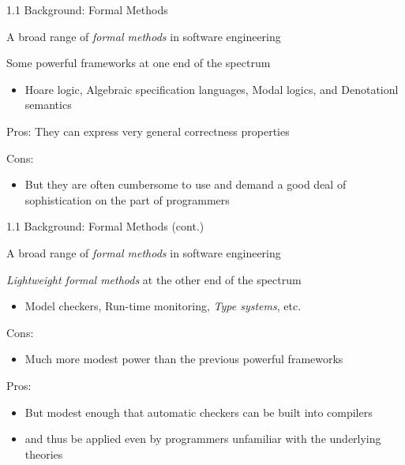 \documentclass[table]{beamer}
\begin{document}
\begin{frame}[t]{1.1 Background: Formal Methods} \vspace{10pt}


A broad range of {\it formal methods } in software engineering

\vspace{10pt}

Some powerful frameworks at one end of the spectrum

\begin{itemize}

\item  Hoare logic, Algebraic specification languages, Modal logics, and Denotationl semantics

\end{itemize}

\vspace{10pt}

Pros: They can express very general correctness properties 

\vspace{10pt}

Cons: 
\begin{itemize}
\item But they are often cumbersome to use and demand a good deal of sophistication on the part of programmers
\end{itemize}

\end{frame}

\begin{frame}[t]{1.1 Background: Formal Methods (cont.)} \vspace{10pt}

A broad range of {\it formal methods } in software engineering 

\vspace{10pt}

{\it Lightweight formal methods} at the other end of the spectrum
\begin{itemize}
\item Model checkers, Run-time monitoring, {\it Type systems}, etc.
\end{itemize}

\vspace{10pt}

Cons: 
\begin{itemize}
\item Much more modest power than the previous powerful frameworks
\end{itemize}

\vspace{10pt}

Pros: 
\begin{itemize}
\item But modest enough that automatic checkers can be built into compilers  
\item and thus be applied even by programmers unfamiliar with the underlying theories
\end{itemize}

\end{frame}
\end{document}
